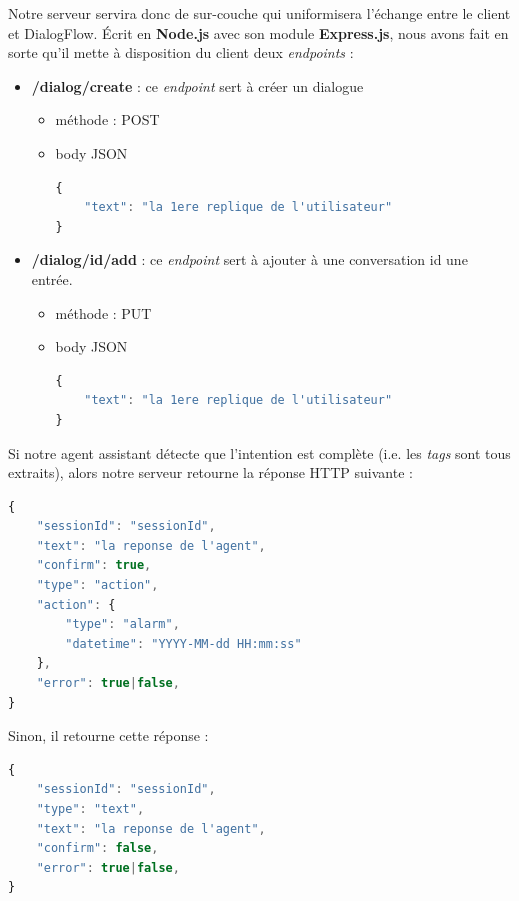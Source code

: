 Notre serveur servira donc de \og sur-couche \fg{} qui uniformisera l'échange entre le client et DialogFlow. Écrit en \textbf{Node.js} avec son module \textbf{Express.js}, nous avons fait en sorte qu'il mette à disposition du client deux \emph{endpoints} :\\
\begin{itemize}
    \item \textbf{/dialog/create} : ce \emph{endpoint} sert à créer un dialogue
    \begin{itemize}
        \item méthode : POST
        \item body JSON 
        \begin{lstlisting}[language=Javascript]
{
    "text": "la 1ere replique de l'utilisateur"
}
        \end{lstlisting}
    \end{itemize}
    \item \textbf{/dialog/{id}/add} : ce \emph{endpoint} sert à ajouter à une conversation \og id \fg{} une entrée.
    \begin{itemize}
        \item méthode : PUT
        \item body JSON 
        \begin{lstlisting}[language=Javascript]
{
    "text": "la 1ere replique de l'utilisateur"
}
        \end{lstlisting}
    \end{itemize}
\end{itemize}


Si notre agent assistant détecte que l'intention est complète (i.e. les \emph{tags} sont tous extraits), alors notre serveur retourne la réponse HTTP suivante :\\

\begin{lstlisting}[language=Javascript]
{
    "sessionId": "sessionId",
    "text": "la reponse de l'agent",
    "confirm": true,
    "type": "action",
    "action": {
        "type": "alarm",
        "datetime": "YYYY-MM-dd HH:mm:ss"
    },
    "error": true|false,
}
\end{lstlisting}

Sinon, il retourne cette réponse : \\

\begin{lstlisting}[language=Javascript]
{
    "sessionId": "sessionId",
    "type": "text",
    "text": "la reponse de l'agent",
    "confirm": false,
    "error": true|false,
}
\end{lstlisting}

